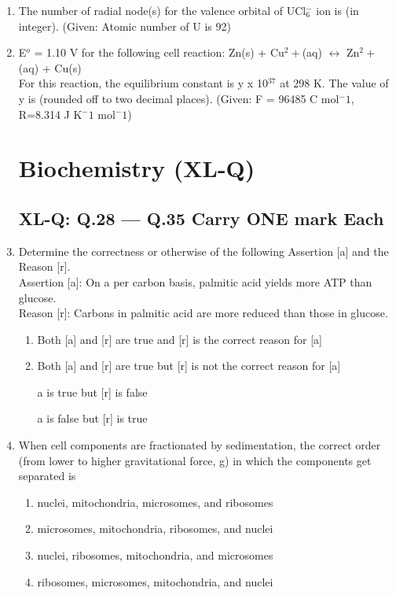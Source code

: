 \documentclass[journal,12pt,onecolumn]{IEEEtran}
\begin{document}
\begin{enumerate}
    \item The number of radial node(s) for the valence orbital of UCl$_6^-$ ion is (in integer). (Given: Atomic number of U is 92)

    \item E$^o$ = 1.10 V for the following cell reaction: Zn(s) + Cu$^2+$(aq) $\leftrightarrow$ Zn$^2+$(aq) + Cu(s)\\
    For this reaction, the equilibrium constant is y x 10$^{37}$ at 298 K. The value of y is (rounded off to two decimal places). (Given: F = 96485 C mol$^-1$, R=8.314 J K$^-1$ mol$^-1$)

\section*{Biochemistry (XL-Q)}
\subsection*{XL-Q: Q.28 --- Q.35 Carry ONE mark Each}

    \item Determine the correctness or otherwise of the following Assertion [a] and the Reason [r].\\
    Assertion [a]: On a per carbon basis, palmitic acid yields more ATP than glucose.\\
    Reason [r]: Carbons in palmitic acid are more reduced than those in glucose.
    \begin{enumerate}
        \item Both [a] and [r] are true and [r] is the correct reason for [a]
        \item Both [a] and [r] are true but [r] is not the correct reason for [a]
        \item [a] is true but [r] is false
        \item [a] is false but [r] is true
    \end{enumerate}

    \item When cell components are fractionated by sedimentation, the correct order (from lower to higher gravitational force, g) in which the components get separated is
    \begin{enumerate}
        \item nuclei, mitochondria, microsomes, and ribosomes
        \item microsomes, mitochondria, ribosomes, and nuclei
        \item nuclei, ribosomes, mitochondria, and microsomes
        \item ribosomes, microsomes, mitochondria, and nuclei
    \end{enumerate}


\end{enumerate}
\end{document}
